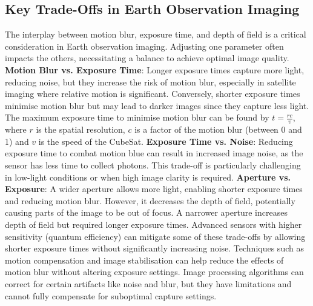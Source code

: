\subsection{Key Trade-Offs in Earth Observation Imaging}
The interplay between motion blur, exposure time, and depth of field is a critical consideration in Earth observation imaging. Adjusting one parameter often impacts the others, necessitating a balance to achieve optimal image quality.
\nl
\textbf{Motion Blur vs. Exposure Time}: Longer exposure times capture more light, reducing noise, but they increase the risk of motion blur, especially in satellite imaging where relative motion is significant. Conversely, shorter exposure times minimise motion blur but may lead to darker images since they capture less light. The maximum exposure time to minimise motion blur can be found by \(t=\frac{rc}{v}\), where $r$ is the spatial resolution, $c$ is a factor of the motion blur (between 0 and 1) and $v$ is the speed of the CubeSat.
\nl
\textbf{Exposure Time vs. Noise}: Reducing exposure time to combat motion blue can result in increased image noise, as the sensor has less time to collect photons. This trade-off is particularly challenging in low-light conditions or when high image clarity is required.
\nl
\textbf{Aperture vs. Exposure}: A wider aperture allows more light, enabling shorter exposure times and reducing motion blur. However, it decreases the depth of field, potentially causing parts of the image to be out of focus. A narrower aperture increases depth of field but required longer exposure times.
\nl
Advanced sensors with higher sensitivity (quantum efficiency) can mitigate some of these trade-offs by allowing shorter exposure times without significantly increasing noise. Techniques such as motion compensation and image stabilisation can help reduce the effects of motion blur without altering exposure settings. Image processing algorithms can correct for certain artifacts like noise and blur, but they have limitations and cannot fully compensate for suboptimal capture settings.

